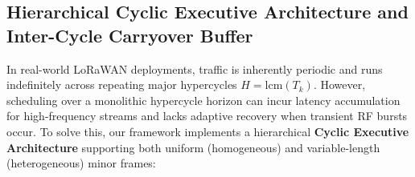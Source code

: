 \documentclass{article}
\begin{document}
\subsection{Hierarchical Cyclic Executive Architecture and Inter-Cycle Carryover Buffer}
\label{subsec:cyclic_executive}

In real-world LoRaWAN deployments, traffic is inherently periodic and runs indefinitely across repeating major hypercycles $H = \text{lcm}(T_k)$. However, scheduling over a monolithic hypercycle horizon can incur latency accumulation for high-frequency streams and lacks adaptive recovery when transient RF bursts occur. To solve this, our framework implements a hierarchical \textbf{Cyclic Executive Architecture} supporting both uniform (homogeneous) and variable-length (heterogeneous) minor frames:
\end{document}
